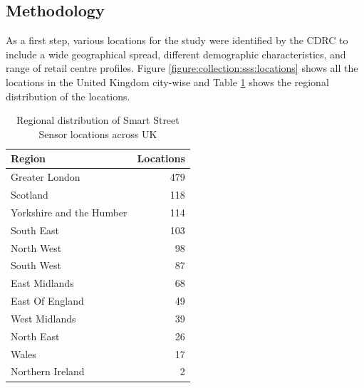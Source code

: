 \subsection{Methodology}
As a first step, various locations for the study were identified by the CDRC to include a wide geographical spread, different demographic characteristics, and range of retail centre profiles.
Figure \ref{figure:collection:sss:locations} shows all the locations in the United Kingdom city-wise and Table \ref{table:collection:sss:locations} shows the regional distribution of the locations.

\begin{table}
  \footnotesize
  \begin{center} 
    \begin{tabular}{lr} 
      \toprule
      Region & Locations \\
      \midrule
      Greater London & 479 \\
      Scotland & 118 \\
      Yorkshire and the Humber & 114 \\
      South East & 103 \\
      North West & 98 \\
      South West & 87 \\
      East Midlands & 68 \\
      East Of England & 49 \\
      West Midlands & 39 \\
      North East & 26 \\
      Wales & 17 \\
      Northern Ireland & 2 \\
      \bottomrule
    \end{tabular}
  \end{center}
  \caption{Regional distribution of Smart Street Sensor locations across UK}
  \label{table:collection:sss:locations}
\end{table}

